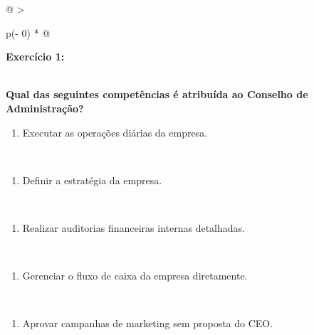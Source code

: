 \documentclass[
]{book}
\providecommand{\tightlist}{%
  \setlength{\itemsep}{0pt}\setlength{\parskip}{0pt}}
\begin{document}
\begin{longtable}[]{@{}
  >{\raggedright\arraybackslash}p{(\columnwidth - 0\tabcolsep) * }@{}}
\toprule\noalign{}
\begin{minipage}[b]{\linewidth}\raggedright
\textbf{Exercício 1:}
\end{minipage} \\
\midrule\noalign{}
\endhead
\bottomrule\noalign{}
\endlastfoot
\textbf{Qual das seguintes competências é atribuída ao Conselho de Administração?} \\
\begin{minipage}[t]{\linewidth}\raggedright
\begin{enumerate}
\def\labelenumi{\alph{enumi})}
\tightlist
\item
  Executar as operações diárias da empresa.
\end{enumerate}
\end{minipage} \\
\begin{minipage}[t]{\linewidth}\raggedright
\begin{enumerate}
\def\labelenumi{\alph{enumi})}
\setcounter{enumi}{1}
\tightlist
\item
  Definir a estratégia da empresa.
\end{enumerate}
\end{minipage} \\
\begin{minipage}[t]{\linewidth}\raggedright
\begin{enumerate}
\def\labelenumi{\alph{enumi})}
\setcounter{enumi}{2}
\tightlist
\item
  Realizar auditorias financeiras internas detalhadas.
\end{enumerate}
\end{minipage} \\
\begin{minipage}[t]{\linewidth}\raggedright
\begin{enumerate}
\def\labelenumi{\alph{enumi})}
\setcounter{enumi}{3}
\tightlist
\item
  Gerenciar o fluxo de caixa da empresa diretamente.
\end{enumerate}
\end{minipage} \\
\begin{minipage}[t]{\linewidth}\raggedright
\begin{enumerate}
\def\labelenumi{\alph{enumi})}
\setcounter{enumi}{4}
\tightlist
\item
  Aprovar campanhas de marketing sem proposta do CEO.
\end{enumerate}
\end{minipage} \\
\end{longtable}
\end{document}
